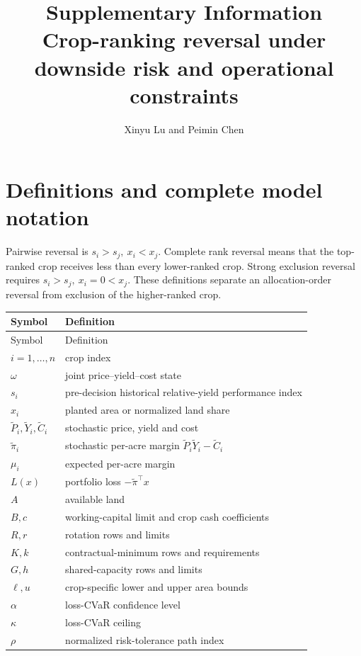 \documentclass[11pt]{article}
\title{\textbf{Supplementary Information}\\
\large Crop-ranking reversal under downside risk and operational constraints}
\author{Xinyu Lu and Peimin Chen}
\date{}
\begin{document}
\maketitle
\tableofcontents

\section{Definitions and complete model notation}

Pairwise reversal is \(s_i>s_j,\ x_i<x_j\). Complete rank reversal means that
the top-ranked crop receives less than every lower-ranked crop. Strong
exclusion reversal requires \(s_i>s_j,\ x_i=0<x_j\). These definitions
separate an allocation-order reversal from exclusion of the higher-ranked
crop.

\begin{longtable}{p{2.2cm}p{11.8cm}}
\toprule
Symbol & Definition\\
\midrule
\endfirsthead
\toprule
Symbol & Definition\\
\midrule
\endhead
\(i=1,\ldots,n\) & crop index\\
\(\omega\) & joint price--yield--cost state\\
\(s_i\) & pre-decision historical relative-yield performance index\\
\(x_i\) & planted area or normalized land share\\
\(\widetilde P_i,\widetilde Y_i,\widetilde C_i\) & stochastic price, yield and cost\\
\(\widetilde\pi_i\) & stochastic per-acre margin
\(\widetilde P_i\widetilde Y_i-\widetilde C_i\)\\
\(\mu_i\) & expected per-acre margin\\
\(L(x)\) & portfolio loss \(-\widetilde\pi^\top x\)\\
\(A\) & available land\\
\(B,c\) & working-capital limit and crop cash coefficients\\
\(R,r\) & rotation rows and limits\\
\(K,k\) & contractual-minimum rows and requirements\\
\(G,h\) & shared-capacity rows and limits\\
\(\ell,u\) & crop-specific lower and upper area bounds\\
\(\alpha\) & loss-CVaR confidence level\\
\(\kappa\) & loss-CVaR ceiling\\
\(\rho\) & normalized risk-tolerance path index\\

\end{longtable}
\end{document}
